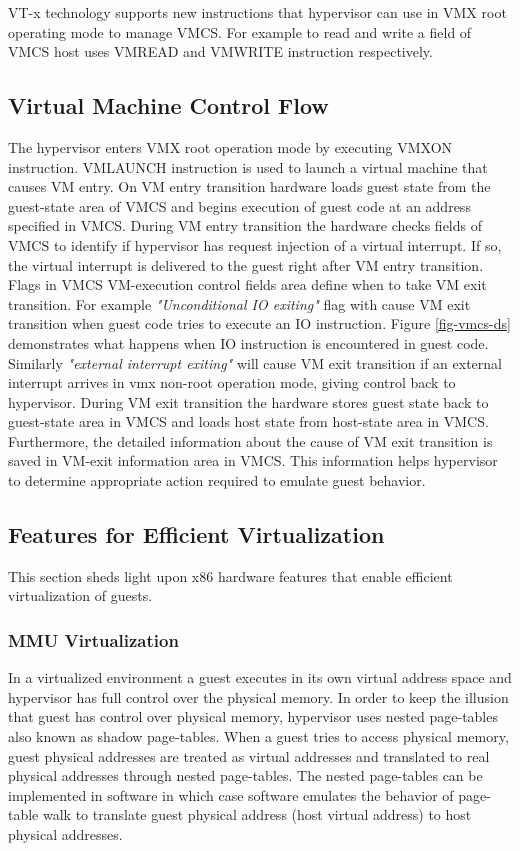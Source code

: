 VT-x technology supports new instructions that hypervisor can use in VMX root operating mode to manage VMCS.
For example to read and write a field of VMCS host uses VMREAD and VMWRITE instruction respectively.



\subsection{Virtual Machine Control Flow}
The hypervisor enters VMX root operation mode by executing VMXON instruction.
VMLAUNCH instruction is used to launch a virtual machine that causes VM entry.
On VM entry transition hardware loads guest state from the guest-state area of VMCS
and begins execution of guest code at an address specified in VMCS.
During VM entry transition the hardware checks fields of VMCS to 
identify if hypervisor has request injection of a virtual interrupt.
If so, the virtual interrupt is delivered to the guest right after VM entry transition.
Flags in VMCS VM-execution control fields area define when to take VM exit transition.
For example \emph{"Unconditional IO exiting"} flag with cause VM exit transition 
when guest code tries to execute an IO instruction. Figure \ref{fig-vmcs-ds} demonstrates 
what happens when IO instruction is encountered in guest code.
Similarly \emph{"external interrupt exiting"} will cause VM exit transition if
an external interrupt arrives in vmx non-root operation mode, giving control back to hypervisor.
During VM exit transition the hardware stores guest state back to guest-state area in VMCS and
loads host state from host-state area in VMCS.
Furthermore, the detailed information about the cause of VM exit transition is
saved in VM-exit information area in VMCS. This information helps hypervisor
to determine appropriate action required to emulate guest behavior.

\subsection{Features for Efficient Virtualization}
This section sheds light upon x86 hardware features that enable efficient virtualization of guests.

\subsubsection{MMU Virtualization} \label{sec:vmmu}
In a virtualized environment a guest executes in its own virtual address space and hypervisor has full control over the physical memory.
In order to keep the illusion that guest has control over physical memory, hypervisor uses nested page-tables also known as shadow page-tables.
When a guest tries to access physical memory, guest physical addresses are treated as virtual addresses and 
translated to real physical addresses through nested page-tables.
The nested page-tables can be implemented in software in which case software emulates the behavior of page-table walk to
translate guest physical address (host virtual address) to host physical addresses.

